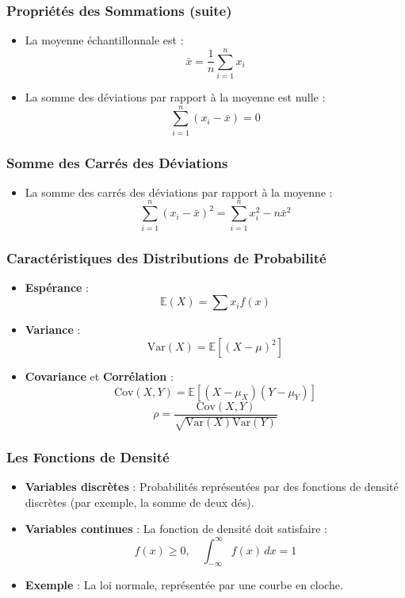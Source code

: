 \documentclass{beamer}
\begin{document}
\begin{frame}
  \frametitle{Propriétés des Sommations (suite)}
  \begin{itemize}
    \item La moyenne échantillonnale est :
    \[
    \bar{x} = \frac{1}{n} \sum_{i=1}^{n} x_i
    \]
    \item La somme des déviations par rapport à la moyenne est nulle :
    \[
    \sum_{i=1}^{n} (x_i - \bar{x}) = 0
    \]
  \end{itemize}
\end{frame}

\begin{frame}
  \frametitle{Somme des Carrés des Déviations}
  \begin{itemize}
    \item La somme des carrés des déviations par rapport à la moyenne :
    \[
    \sum_{i=1}^{n} (x_i - \bar{x})^2 = \sum_{i=1}^{n} x_i^2 - n\bar{x}^2
    \]
  \end{itemize}
\end{frame}

\begin{frame}
  \frametitle{Caractéristiques des Distributions de Probabilité}
  \begin{itemize}
    \item \textbf{Espérance} :
    \[
    \mathbb{E}(X) = \sum x_i f(x)
    \]
    \item \textbf{Variance} :
    \[
    \text{Var}(X) = \mathbb{E}[(X - \mu)^2]
    \]
    \item \textbf{Covariance} et \textbf{Corrélation} :
    \[
    \text{Cov}(X,Y) = \mathbb{E}[(X - \mu_X)(Y - \mu_Y)]
    \]
    \[
    \rho = \frac{\text{Cov}(X,Y)}{\sqrt{\text{Var}(X)\text{Var}(Y)}}
    \]
  \end{itemize}
\end{frame}

\begin{frame}
  \frametitle{Les Fonctions de Densité}
  \begin{itemize}
    \item \textbf{Variables discrètes} : Probabilités représentées par des fonctions de densité discrètes (par exemple, la somme de deux dés).
    \item \textbf{Variables continues} : La fonction de densité doit satisfaire :
    \[
    f(x) \geq 0, \quad \int_{-\infty}^{\infty} f(x) \, dx = 1
    \]
    \item \textbf{Exemple} : La loi normale, représentée par une courbe en cloche.
  \end{itemize}
\end{frame}
\end{document}
